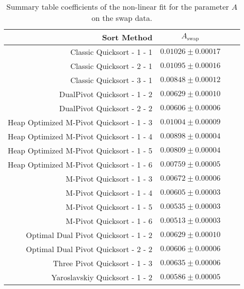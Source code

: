 


		\begin{table}
			\begin{center}
				\begin{tabular}{|r|c|c|c}
					\hline
									Sort Method              &   $A_{\text{swap}}$      \\ \hline \hline
					                Classic Quicksort - 1 - 1 &   $0.01026 \pm  0.00017$ \\ \hline
					                Classic Quicksort - 2 - 1 &   $0.01095 \pm  0.00016$ \\ \hline
					                Classic Quicksort - 3 - 1 &   $0.00848 \pm  0.00012$ \\ \hline
					              DualPivot Quicksort - 1 - 2 &   $0.00629 \pm  0.00010$ \\ \hline
					              DualPivot Quicksort - 2 - 2 &   $0.00606 \pm  0.00006$ \\ \hline
					 Heap Optimized M-Pivot Quicksort - 1 - 3 &   $0.01004 \pm  0.00009$ \\ \hline
					 Heap Optimized M-Pivot Quicksort - 1 - 4 &   $0.00898 \pm  0.00004$ \\ \hline
					 Heap Optimized M-Pivot Quicksort - 1 - 5 &   $0.00809 \pm  0.00004$ \\ \hline
					 Heap Optimized M-Pivot Quicksort - 1 - 6 &   $0.00759 \pm  0.00005$ \\ \hline
					                M-Pivot Quicksort - 1 - 3 &   $0.00672 \pm  0.00006$ \\ \hline
					                M-Pivot Quicksort - 1 - 4 &   $0.00605 \pm  0.00003$ \\ \hline
					                M-Pivot Quicksort - 1 - 5 &   $0.00535 \pm  0.00003$ \\ \hline
					                M-Pivot Quicksort - 1 - 6 &   $0.00513 \pm  0.00003$ \\ \hline
					     Optimal Dual Pivot Quicksort - 1 - 2 &   $0.00629 \pm  0.00010$ \\ \hline
					     Optimal Dual Pivot Quicksort - 2 - 2 &   $0.00606 \pm  0.00006$ \\ \hline
					            Three Pivot Quicksort - 1 - 3 &   $0.00635 \pm  0.00006$ \\ \hline
					           Yaroslavskiy Quicksort - 1 - 2 &   $0.00586 \pm  0.00005$ \\ \hline
				\end{tabular}
				\caption{Summary table coefficients of the non-linear fit for the parameter $A$ on the swap data.}
				\label{tab:swapFitCoeffA}
			\end{center}
		\end{table}


